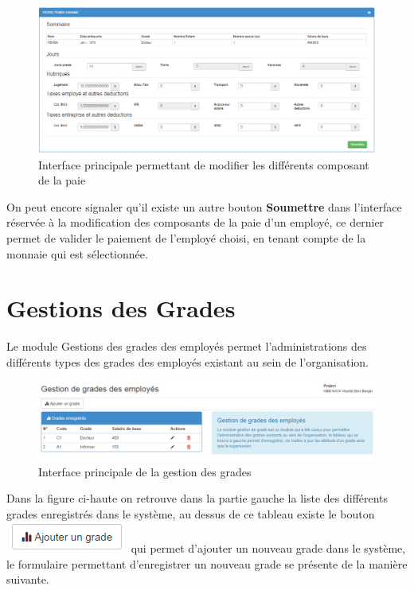 \documentclass[12pt,a4paper]{report}
\begin{document}
\begin{figure}[h]
\begin{center}
\includegraphics[width=14cm]{pic/payrollEmp.png}
\end{center}
\caption{Interface principale permettant de modifier les différents composant de la paie}
\label{Interface principale permettant de modifier les différents composant de la paie}
\end{figure}

On peut encore signaler qu'il existe un autre bouton \textbf{Soumettre} dans l'interface réservée à la modification des composants de la paie d'un employé, ce dernier permet de valider le paiement de l'employé choisi, en tenant compte de la monnaie qui est sélectionnée. 

\newpage
\section{Gestions des Grades}
Le module Gestions des grades des employés permet l'administrations des différents types des grades des employés existant au sein de l'organisation.
\begin{figure}[h]
\begin{center}
\includegraphics[width=14cm]{pic/gradeEmp.png}
\end{center}
\caption{Interface principale de la gestion des grades}
\label{Interface principale de la gestion des grades}
\end{figure}

Dans la figure ci-haute on retrouve dans la partie gauche la liste des différents grades enregistrés dans le système, au dessus de ce tableau existe le bouton \includegraphics[scale=1]{pic/AddGrade.png} qui permet d'ajouter un nouveau grade dans le système, le formulaire permettant d'enregistrer un nouveau grade se présente de la manière suivante.
\end{document}
